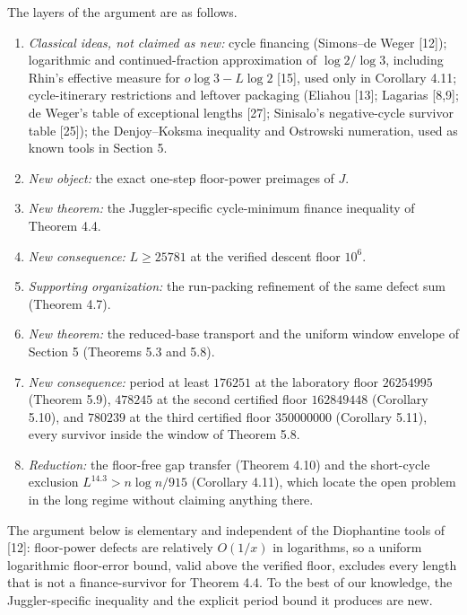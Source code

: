 \documentclass[12pt]{article}
\providecommand{\tightlist}{\setlength{\itemsep}{0pt}\setlength{\parskip}{0pt}}
\begin{document}
The layers of the argument are as follows.

\begin{enumerate}
\def\labelenumi{\arabic{enumi}.}
\tightlist
\item
  \emph{Classical ideas, not claimed as new:} cycle financing
  (Simons--de Weger {[}12{]}); logarithmic and continued-fraction
  approximation of \(\log 2/\log 3\), including Rhin's effective measure
  for \(o\log 3-L\log 2\) {[}15{]}, used only in Corollary 4.11;
  cycle-itinerary restrictions and leftover packaging (Eliahou {[}13{]};
  Lagarias {[}8,9{]}; de Weger's table of exceptional lengths {[}27{]};
  Sinisalo's negative-cycle survivor table {[}25{]}); the Denjoy--Koksma
  inequality and Ostrowski numeration, used as known tools in Section 5.
\item
  \emph{New object:} the exact one-step floor-power preimages of \(J\).
\item
  \emph{New theorem:} the Juggler-specific cycle-minimum finance
  inequality of Theorem 4.4.
\item
  \emph{New consequence:} \(L\ge 25781\) at the verified descent floor
  \(10^6\).
\item
  \emph{Supporting organization:} the run-packing refinement of the same
  defect sum (Theorem 4.7).
\item
  \emph{New theorem:} the reduced-base transport and the uniform window
  envelope of Section 5 (Theorems 5.3 and 5.8).
\item
  \emph{New consequence:} period at least \(176251\) at the laboratory
  floor \(26254995\) (Theorem 5.9), \(478245\) at the second certified
  floor \(162849448\) (Corollary 5.10), and \(780239\) at the third
  certified floor \(350000000\) (Corollary 5.11), every survivor inside
  the window of Theorem 5.8.
\item
  \emph{Reduction:} the floor-free gap transfer (Theorem 4.10) and the
  short-cycle exclusion \(L^{14.3}>n\log n/915\) (Corollary 4.11), which
  locate the open problem in the long regime without claiming anything
  there.
\end{enumerate}

The argument below is elementary and independent of the Diophantine
tools of {[}12{]}: floor-power defects are relatively \(O(1/x)\) in
logarithms, so a uniform logarithmic floor-error bound, valid above the
verified floor, excludes every length that is not a finance-survivor for
Theorem 4.4. To the best of our knowledge, the Juggler-specific
inequality and the explicit period bound it produces are new.
\end{document}
